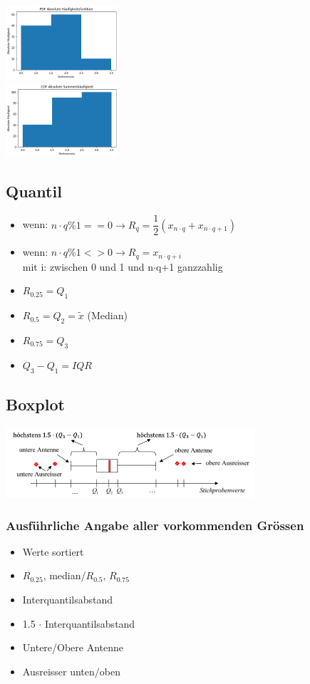 \documentclass[8pt,a4paper]{scrartcl}
\begin{document}
\begin{multicols*}{3}
			\begin{multicols*}{2}
				\includegraphics[height=2.75cm]{img/pdf1.png} \\
				\includegraphics[height=2.75cm]{img/cdf1.png} \\
			\end{multicols*}
			
		\subsection{Quantil}   
			\begin{itemize}\itemsep0pt				
				\item wenn: $n\cdot q\%1 == 0 \rightarrow R_{q} = \dfrac{1}{2}(x_{n\cdot q}+x_{n\cdot q+1})$
				\item wenn: $n\cdot q\%1 <> 0 \rightarrow R_{q} = x_{n\cdot q+i}$ \\ mit i: zwischen 0 und 1 und n$\cdot$q+1 ganzzahlig
				\item $R_{0.25} = Q_{1}$
				\item $R_{0.5} = Q_{2} = \tilde{x}$ (Median)
				\item $R_{0.75} = Q_{3}$		
				\item $Q_{3} - Q_{1} = IQR$
			\end{itemize}
		\subsection{Boxplot}   
			\includegraphics[height=2.6cm]{img/Boxplot.png}
			\subsubsection{Ausführliche Angabe aller vorkommenden Grössen}   
				\begin{itemize}\itemsep0pt				
					\item Werte sortiert
					\item $R_{0.25}$, median/$R_{0.5}$, $R_{0.75}$
					\item Interquantilsabstand
					\item 1.5 $\cdot$ Interquantilsabstand
					\item Untere/Obere Antenne
					\item Ausreisser unten/oben
				\end{itemize}		

\end{multicols*}
\end{document}
